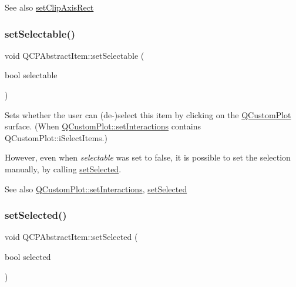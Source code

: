 \begin{DoxySeeAlso}{See also}
\mbox{\hyperlink{class_q_c_p_abstract_item_a7dc75fcbcd10206fe0b75d757ea7a347}{set\+Clip\+Axis\+Rect}} 
\end{DoxySeeAlso}
\mbox{\label{class_q_c_p_abstract_item_a8a8e32a55bc478b849756a78c2d87fd2}} 
\subsubsection{\texorpdfstring{set\+Selectable()}{setSelectable()}}
{\footnotesize\ttfamily void Q\+C\+P\+Abstract\+Item\+::set\+Selectable (\begin{DoxyParamCaption}\item[{bool}]{selectable }\end{DoxyParamCaption})}

Sets whether the user can (de-\/)select this item by clicking on the \mbox{\hyperlink{class_q_custom_plot}{Q\+Custom\+Plot}} surface. (When \mbox{\hyperlink{class_q_custom_plot_a5ee1e2f6ae27419deca53e75907c27e5}{Q\+Custom\+Plot\+::set\+Interactions}} contains Q\+Custom\+Plot\+::i\+Select\+Items.)

However, even when {\itshape selectable} was set to false, it is possible to set the selection manually, by calling \mbox{\hyperlink{class_q_c_p_abstract_item_a203de94ad586cc44d16c9565f49d3378}{set\+Selected}}.

\begin{DoxySeeAlso}{See also}
\mbox{\hyperlink{class_q_custom_plot_a5ee1e2f6ae27419deca53e75907c27e5}{Q\+Custom\+Plot\+::set\+Interactions}}, \mbox{\hyperlink{class_q_c_p_abstract_item_a203de94ad586cc44d16c9565f49d3378}{set\+Selected}} 
\end{DoxySeeAlso}
\mbox{\label{class_q_c_p_abstract_item_a203de94ad586cc44d16c9565f49d3378}} 
\subsubsection{\texorpdfstring{set\+Selected()}{setSelected()}}
{\footnotesize\ttfamily void Q\+C\+P\+Abstract\+Item\+::set\+Selected (\begin{DoxyParamCaption}\item[{bool}]{selected }\end{DoxyParamCaption})}

